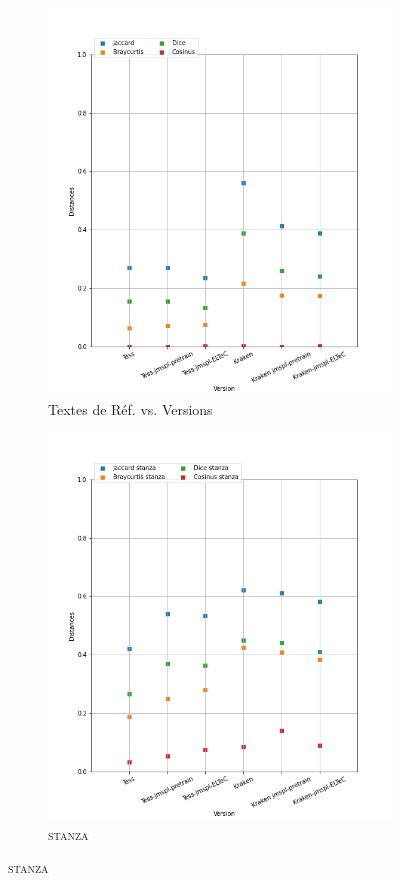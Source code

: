 \begin{figure}
\begin{minipage}{6cm}
  \begin{subfigure}{0.89\textwidth}
  \includegraphics[width=.89\textwidth]{IMAGES/ELTeC_DISTANCES_spaCy3.5.1/TROLLOPE-graph-dist-spaCy3.5.1-txt.png} 
  \caption{Textes de Réf. vs. Versions}
  \label{fig:TROLLOP_DIST_txt}
  \end{subfigure}
  \end{minipage}
  \begin{minipage}{6cm}
  \begin{subfigure}{0.89\textwidth}
  \includegraphics[width=.89\textwidth]{IMAGES/ELTeC_DISTANCES_stanza/TROLLOPE-graph-dist-stanza-stanza.png}
   \caption{\textsc{stanza}}
 

\end{subfigure}
\end{minipage}
\end{figure}
